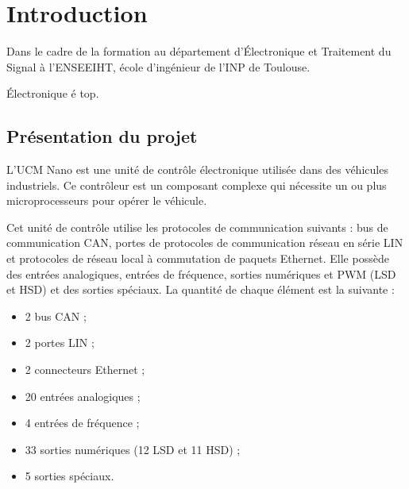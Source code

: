 \chapter*{Introduction}
\label{chap:introduction}

Dans le cadre de la formation au département d'Électronique et Traitement du Signal à l'ENSEEIHT, école d'ingénieur de l'INP de Toulouse.

Électronique é top.


\section*{Présentation du projet}

L'UCM Nano est une unité de contrôle électronique utilisée dans des véhicules industriels. Ce contrôleur est un composant complexe qui nécessite un ou plus microprocesseurs pour opérer le véhicule.


Cet unité de contrôle utilise les protocoles de communication suivants : bus de communication CAN, portes de protocoles de communication réseau en série LIN et protocoles de réseau local à commutation de paquets Ethernet. Elle possède des entrées analogiques, entrées de fréquence, sorties numériques et PWM (LSD et HSD) et des sorties spéciaux. La quantité de chaque élément est la suivante :




\renewcommand{\labelitemi}{\textbullet}
\begin{itemize}
    \item 2 bus CAN ;
    \item 2 portes LIN ;
    \item 2 connecteurs Ethernet ;
    \item 20 entrées analogiques ;
    \item 4 entrées de fréquence ;
    \item 33 sorties numériques (12 LSD et 11 HSD) ;
    \item 5 sorties spéciaux.
\end{itemize}

